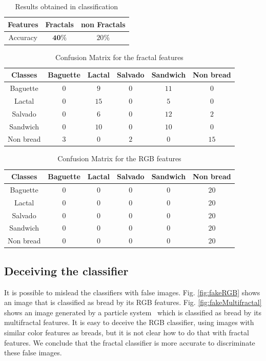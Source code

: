 \documentclass[oneside,a4paper,english,links]{amca}
\begin{document}
\begin{table}[htb]
\centering
\begin{tabular}{|c|c|c|}
    \hline
    Features & Fractals & non Fractals\\
    \hline
    Accuracy  & $\textbf{40}\%$ & $20\%$\\
    \hline
\end{tabular}
\caption{Results obtained in classification}
\label{table:tableRobustness}
\end{table}


\begin{table}[htb]
\centering
\begin{tabular}{|c|c|c|c|c|c|}
    \hline
    Classes & Baguette & Lactal & Salvado & Sandwich & Non bread\\
    \hline
    Baguette    &   $0$  &   $9$  &   $0$  &  $11$ &   $0$\\
    \hline
    Lactal  & $0$ & $15$ & $0$ & $5$ & $0$\\
    \hline
    Salvado & $0$ & $6$ & $0$ & $12$ & $2$\\
    \hline
    Sandwich  & $0$ & $10$ & $0$ & $10$ & $0$\\
    \hline
    Non bread  & $3$ & $0$ & $2$ & $0$ & $15$\\
    \hline
\end{tabular}
\caption{Confusion Matrix for the fractal features}
\label{table:ConfusionMatrixFractal}
\end{table}

\begin{table}[htb]
\centering
\begin{tabular}{|c|c|c|c|c|c|}
    \hline
    Classes & Baguette & Lactal & Salvado & Sandwich & Non bread\\
    \hline
    Baguette  & $0$ & $0$ & $0$ & $0$ & $20$\\
    \hline
    Lactal  & $0$ & $0$ & $0$ & $0$ & $20$\\
    \hline
    Salvado & $0$ & $0$ & $0$ & $0$ & $20$\\
    \hline
    Sandwich  & $0$ & $0$ & $0$ & $0$ & $20$\\
    \hline
    Non bread  & $0$ & $0$ & $0$ & $0$ & $20$\\
    \hline
\end{tabular}
\caption{Confusion Matrix for the RGB features}
\label{table:ConfusionMatrixNonFractal}
\end{table}

\subsection{Deceiving the classifier}
It is possible to mislead the classifiers with false images. Fig. \ref{fig:fakeRGB} shows an image that is classified as bread by its RGB features. Fig. \ref{fig:fakeMultifractal} shows an image generated by a particle system~\cite{Baravalle2011} which is classified as bread by its multifractal features. It is easy to deceive the RGB classifier, using images with similar color features as breads, but it is not clear how to do that with fractal features. We conclude that the fractal classifier is more accurate to discriminate these false images.
\end{document}
